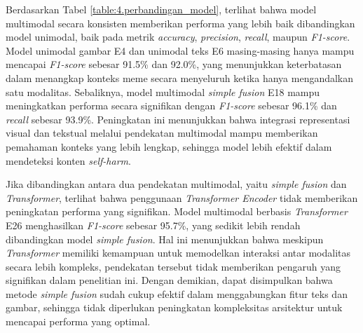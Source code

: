 \begin{table}[H]
    \centering
    \caption{Perbandingan Performa Model}
    \label{table:4.perbandingan_model}
    \small
    \setlength{\tabcolsep}{6pt} %
    \renewcommand{\arraystretch}{1.2}
    
\end{table}

Berdasarkan Tabel \ref{table:4.perbandingan_model}, terlihat bahwa model multimodal secara konsisten memberikan performa yang lebih baik dibandingkan model unimodal, baik pada metrik \textit{accuracy}, \textit{precision}, \textit{recall}, maupun \textit{F1-score}. Model unimodal gambar E4 dan unimodal teks E6 masing-masing hanya mampu mencapai \textit{F1-score} sebesar 91.5\% dan 92.0\%, yang menunjukkan keterbatasan dalam menangkap konteks meme secara menyeluruh ketika hanya mengandalkan satu modalitas. Sebaliknya, model multimodal \textit{simple fusion} E18 mampu meningkatkan performa secara signifikan dengan \textit{F1-score} sebesar 96.1\% dan \textit{recall} sebesar 93.9\%. Peningkatan ini menunjukkan bahwa integrasi representasi visual dan tekstual melalui pendekatan multimodal mampu memberikan pemahaman konteks yang lebih lengkap, sehingga model lebih efektif dalam mendeteksi konten \textit{self-harm}.

Jika dibandingkan antara dua pendekatan multimodal, yaitu \textit{simple fusion} dan \textit{Transformer}, terlihat bahwa penggunaan \textit{Transformer Encoder} tidak memberikan peningkatan performa yang signifikan. Model multimodal berbasis \textit{Transformer} E26 menghasilkan \textit{F1-score} sebesar 95.7\%, yang sedikit lebih rendah dibandingkan model \textit{simple fusion}. Hal ini menunjukkan bahwa meskipun \textit{Transformer} memiliki kemampuan untuk memodelkan interaksi antar modalitas secara lebih kompleks, pendekatan tersebut tidak memberikan pengaruh yang signifikan dalam penelitian ini. Dengan demikian, dapat disimpulkan bahwa metode \textit{simple fusion} sudah cukup efektif dalam menggabungkan fitur teks dan gambar, sehingga tidak diperlukan peningkatan kompleksitas arsitektur untuk mencapai performa yang optimal.

